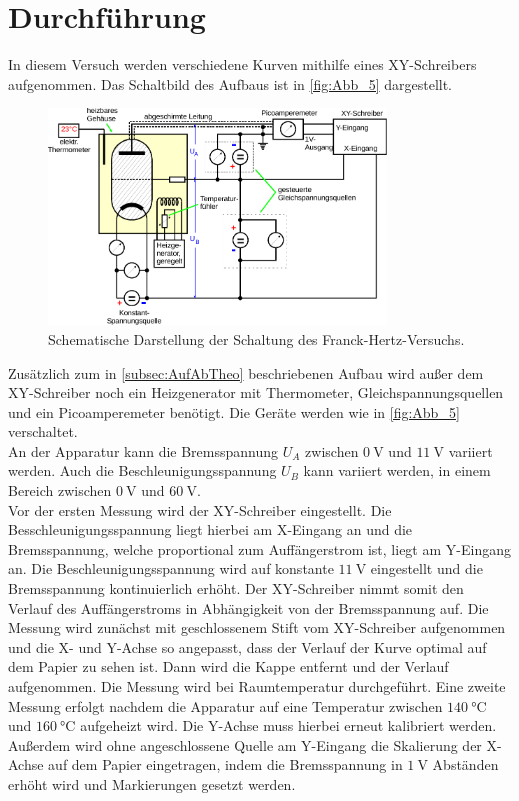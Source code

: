 \section{Durchführung}
\label{sec:Durchführung}

In diesem Versuch werden verschiedene Kurven mithilfe eines XY-Schreibers aufgenommen.
Das Schaltbild des Aufbaus ist in \autoref{fig:Abb_5} dargestellt.
\begin{figure}[H]
    \centering
    \includegraphics[width=0.8\textwidth]{build/Abb_5.pdf}
    \caption{Schematische Darstellung der Schaltung des Franck-Hertz-Versuchs\cite{V601}.}
    \label{fig:Abb_5}
\end{figure}
Zusätzlich zum in \autoref{subsec:AufAbTheo} beschriebenen Aufbau wird außer dem XY-Schreiber noch ein Heizgenerator mit Thermometer,
Gleichspannungsquellen und ein Picoamperemeter benötigt.
Die Geräte werden wie in \autoref{fig:Abb_5} verschaltet.\\

An der Apparatur kann die Bremsspannung $U_A$ zwischen $\qty{0}{\volt}$ und $\qty{11}{\volt}$ variiert werden.
Auch die Beschleunigungsspannung $U_B$ kann variiert werden, in einem Bereich zwischen $\qty{0}{\volt}$ und $\qty{60}{\volt}$.\\

Vor der ersten Messung wird der XY-Schreiber eingestellt.
Die Besschleunigungsspannung liegt hierbei am X-Eingang an und die Bremsspannung, welche proportional zum Auffängerstrom ist, liegt am Y-Eingang an.
Die Beschleunigungsspannung wird auf konstante $\qty{11}{\volt}$ eingestellt und die Bremsspannung kontinuierlich erhöht.
Der XY-Schreiber nimmt somit den Verlauf des Auffängerstroms in Abhängigkeit von der Bremsspannung auf.
Die Messung wird zunächst mit geschlossenem Stift vom XY-Schreiber aufgenommen und die X- und Y-Achse so angepasst, dass der 
Verlauf der Kurve optimal auf dem Papier zu sehen ist. Dann wird die Kappe entfernt und der Verlauf aufgenommen.
Die Messung wird bei Raumtemperatur durchgeführt.
Eine zweite Messung erfolgt nachdem die Apparatur auf eine Temperatur zwischen $\qty{140}{\celsius}$ und $\qty{160}{\celsius}$
aufgeheizt wird. Die Y-Achse muss hierbei erneut kalibriert werden.
Außerdem wird ohne angeschlossene Quelle am Y-Eingang die Skalierung der X-Achse auf dem Papier eingetragen, indem die Bremsspannung
in $\qty{1}{\volt}$ Abständen erhöht wird und Markierungen gesetzt werden.\\

